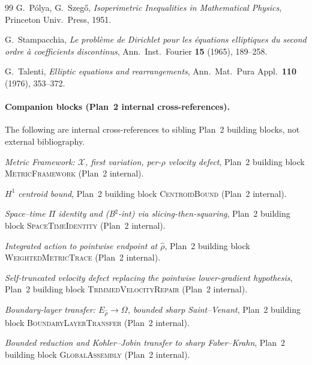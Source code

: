 \documentclass[11pt]{article}
\theoremstyle{definition}
\newcommand{\Om}{\Omega}
\begin{document}
\begin{thebibliography}{99}
 G.~P\'olya, G.~Szeg\H{o},
\emph{Isoperimetric Inequalities in Mathematical Physics}, Princeton
Univ.\ Press, 1951.

 G.~Stampacchia,
\emph{Le probl\`eme de Dirichlet pour les \'equations elliptiques du
second ordre \`a coefficients discontinus}, Ann.\ Inst.\ Fourier
\textbf{15} (1965), 189--258.

 G.~Talenti,
\emph{Elliptic equations and rearrangements}, Ann.\ Mat.\ Pura Appl.\
\textbf{110} (1976), 353--372.

\paragraph{Companion blocks (Plan~2 internal cross-references).}
The following are internal cross-references to sibling Plan~2
building blocks, not external bibliography.

 \emph{Metric Framework: $\mathcal X$,
first variation, per-$\rho$ velocity defect}, Plan~2 building block
\textsc{MetricFramework} (Plan~2 internal).

 \emph{$H^{1}$ centroid bound}, Plan~2 building
block \textsc{CentroidBound} (Plan~2 internal).

 \emph{Space--time $\Pi$ identity and
(B$^{2}$-int) via slicing-then-squaring}, Plan~2 building block
\textsc{SpaceTimeIdentity} (Plan~2 internal).

 \emph{Integrated action to pointwise
endpoint at $\widehat\rho$}, Plan~2 building block
\textsc{WeightedMetricTrace} (Plan~2 internal).

 \emph{Self-truncated velocity defect
replacing the pointwise lower-gradient hypothesis}, Plan~2 building
block \textsc{TrimmedVelocityRepair} (Plan~2 internal).

 \emph{Boundary-layer transfer:
$E_{\widehat\rho}\to\Om$, bounded sharp Saint--Venant}, Plan~2 building
block \textsc{BoundaryLayerTransfer} (Plan~2 internal).

 \emph{Bounded reduction and Kohler--Jobin
transfer to sharp Faber--Krahn}, Plan~2 building block
\textsc{GlobalAssembly} (Plan~2 internal).

\end{thebibliography}
\end{document}
